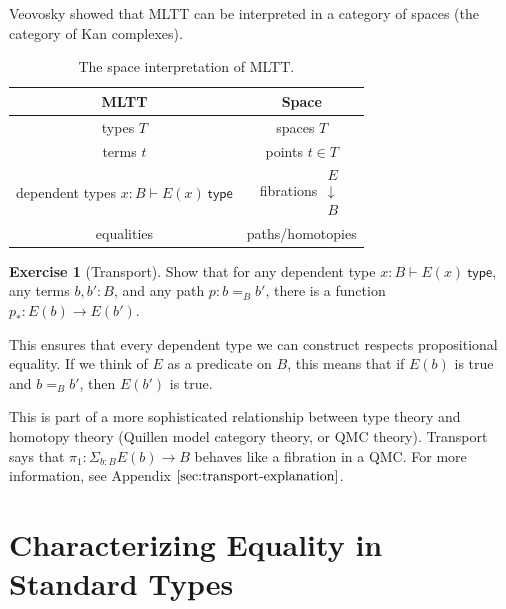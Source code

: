 \documentclass{amsart}
\theoremstyle{definition}
\newtheorem{ex}{Exercise}[section]
\newcommand{\type}{\ensuremath{\mathsf{~type}}}
\begin{document}
Veovosky showed that MLTT can be interpreted in a category of spaces (the category of Kan complexes).
\begin{table}[h]
    \centering
    \begin{tabular}{|c|c|}\hline
        MLTT & Space\\\hline
        types $T$ & spaces $T$\\\hline
        terms $t$ & points $t \in T$\\\hline
        dependent types $x : B \vdash E(x) \type$ & fibrations 
            $\begin{array}{c}
            E\\
            \downarrow\\
            B
            \end{array}$\\\hline
        equalities & paths/homotopies\\\hline
    \end{tabular}
    \caption{The space interpretation of MLTT.}
    \label{tab:the-space-interpretation-of-mltt}
\end{table}

\begin{ex}[Transport]
    Show that for any dependent type $x : B \vdash E(x) \type $, any terms $b, b' : B$, and any path $p : b =_B b'$, there is a function $p_{*} : E(b) \to E(b')$.
\end{ex}
This ensures that every dependent type we can construct respects propositional equality. 
If we think of $E$ as a predicate on $B$, this means that if $E(b)$ is true and $b =_B b'$, then $E(b')$ is true.

This is part of a more sophisticated relationship between type theory and homotopy theory (Quillen model category theory, or QMC theory). 
Transport says that $\pi_{1} : \Sigma_{b : B} E(b) \rightarrow B$ behaves like a fibration in a QMC. For more information, see Appendix $\ref{sec:transport-explanation}$.

\section{Characterizing Equality in Standard Types}
\end{document}
